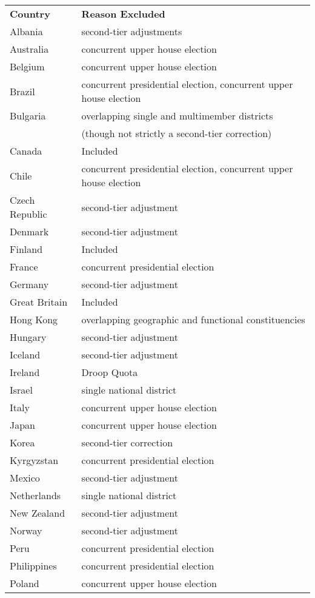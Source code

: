 \documentclass[12pt]{article}
\begin{document}
\begin{appendix}
\begin{table}
{\scriptsize \begin{tabular}{ll}
\textbf{Country} & \textbf{Reason Excluded}\\
Albania & second-tier adjustments\\
Australia & concurrent upper house election \\
Belgium & concurrent upper house election\\
Brazil & concurrent presidential election, concurrent upper house election\\
Bulgaria & overlapping single and multimember districts \\
&(though not strictly a second-tier correction)\\
Canada & Included\\
Chile & concurrent presidential election, concurrent upper house election\\
Czech Republic & second-tier adjustment\\
Denmark & second-tier adjustment\\
Finland & Included\\
France & concurrent presidential election\\
Germany & second-tier adjustment\\
Great Britain & Included\\
Hong Kong & overlapping geographic and functional constituencies\\
Hungary & second-tier adjustment\\
Iceland & second-tier adjustment\\
Ireland & Droop Quota\\
Israel & single national district\\
Italy & concurrent upper house election\\
Japan & concurrent upper house election\\
Korea & second-tier correction\\
Kyrgyzstan & concurrent presidential election\\
Mexico & second-tier adjustment\\
Netherlands & single national district\\
New Zealand&second-tier adjustment\\
Norway&second-tier adjustment\\
Peru&concurrent presidential election\\
Philippines&concurrent presidential election\\
Poland&concurrent upper house election\\

\end{tabular}}
\end{table}
\end{appendix}
\end{document}
